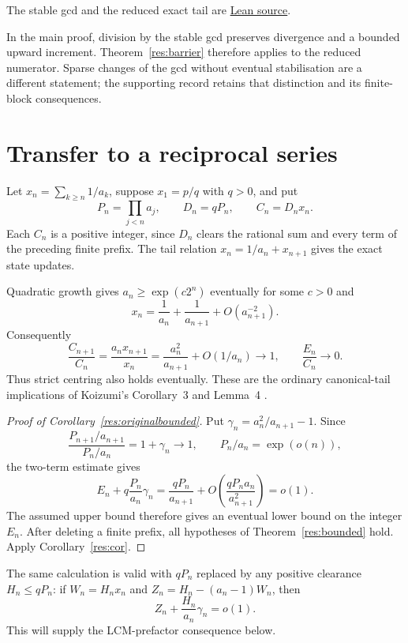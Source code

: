 \documentclass[11pt]{article}
\begin{document}
\noindent The stable gcd and the reduced exact tail are
\href{https://github.com/wcook04/plectis-erdos/blob/f36a98bf3d3e6f65f1074e3b800e3293d5b8a51a/ErdosProblems/Erdos243/PaperCompleteR7/Reduction.lean#L103}{Lean source}.

In the main proof, division by the stable gcd preserves divergence and a
bounded upward increment. Theorem~\ref{res:barrier} therefore applies to
the reduced numerator. Sparse changes of the gcd without eventual
stabilisation are a different statement; the supporting record retains
that distinction and its finite-block consequences.

\section{Transfer to a reciprocal series}\label{sec:transfer}
Let $x_n=\sum_{k\ge n}1/a_k$, suppose $x_1=p/q$ with $q>0$, and put
\[
 P_n=\prod_{j<n}a_j,\qquad D_n=qP_n,\qquad C_n=D_nx_n.
\]
Each $C_n$ is a positive integer, since $D_n$ clears the rational sum and
every term of the preceding finite prefix. The tail relation
$x_n=1/a_n+x_{n+1}$ gives the exact state updates.

Quadratic growth gives $a_n\ge\exp(c2^n)$ eventually for some $c>0$ and
\[
 x_n=\frac1{a_n}+\frac1{a_{n+1}}+O(a_{n+1}^{-2}).
\]
Consequently
\[
 \frac{C_{n+1}}{C_n}
 =\frac{a_nx_{n+1}}{x_n}
 =\frac{a_n^2}{a_{n+1}}+O(1/a_n)\longrightarrow1,
 \qquad \frac{E_n}{C_n}\longrightarrow0.
\]
Thus strict centring also holds eventually. These are the ordinary
canonical-tail implications of Koizumi's Corollary~3 and Lemma~4
\cite{koizumi2025}.

\begin{proof}[Proof of Corollary~\ref{res:originalbounded}]
Put $\gamma_n=a_n^2/a_{n+1}-1$. Since
\[
 \frac{P_{n+1}/a_{n+1}}{P_n/a_n}=1+\gamma_n\longrightarrow1,
 \qquad P_n/a_n=\exp(o(n)),
\]
the two-term estimate gives
\begin{equation}\label{eq:canonical-dictionary}
 E_n+q\frac{P_n}{a_n}\gamma_n
 =\frac{qP_n}{a_{n+1}}+
 O\!\left(\frac{qP_na_n}{a_{n+1}^2}\right)=o(1).
\end{equation}
The assumed upper bound therefore gives an eventual lower bound on the
integer $E_n$. After deleting a finite prefix, all hypotheses of
Theorem~\ref{res:bounded} hold. Apply Corollary~\ref{res:cor}.
\end{proof}

The same calculation is valid with $qP_n$ replaced by any positive
clearance $H_n\le qP_n$: if $W_n=H_nx_n$ and
$Z_n=H_n-(a_n-1)W_n$, then
\begin{equation}\label{eq:general-clearance-dictionary}
 Z_n+\frac{H_n}{a_n}\gamma_n=o(1).
\end{equation}
This will supply the LCM-prefactor consequence below.
\end{document}
